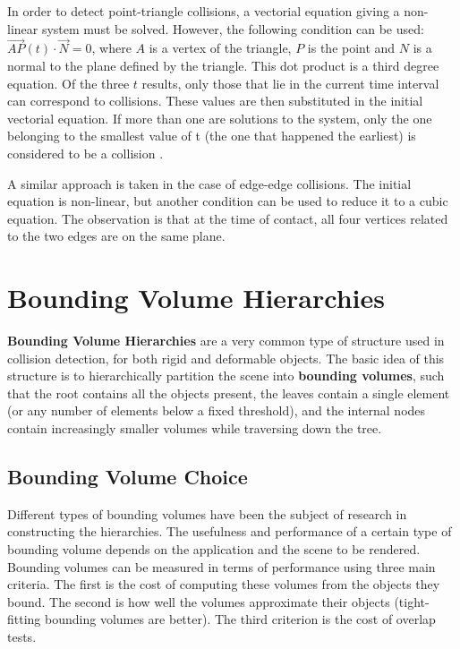 In order to detect point-triangle collisions, a vectorial equation giving a non-linear system must be solved. However, the following condition can be used: $\overrightarrow{AP}(t) \cdot \overrightarrow{N} = 0$, where $A$ is a vertex of the triangle, $P$ is the point and $N$ is a normal to the plane defined by the triangle. This dot product is a third degree equation. Of the three $t$ results, only those that lie in the current time interval can correspond to collisions. These values are then substituted in the initial vectorial equation. If more than one are solutions to the system, only the one belonging to the smallest value of t (the one that happened the earliest) is considered to be a collision \citep{provot97}.

A similar approach is taken in the case of edge-edge collisions. The initial equation is non-linear, but another condition can be used to reduce it to a cubic equation. The observation is that at the time of contact, all four vertices related to the two edges are on the same plane.


\section{Bounding Volume Hierarchies}
\label{sec:bvh}


\textbf{Bounding Volume Hierarchies} are a very common type of structure used in collision detection, for both rigid and deformable objects. The basic idea of this structure is to hierarchically partition the scene into \textbf{bounding volumes}, such that the root contains all the objects present, the leaves contain a single element (or any number of elements below a fixed threshold), and the internal nodes contain increasingly smaller volumes while traversing down the tree.

\subsection{Bounding Volume Choice}
\label{sub-sec:bvc}

Different types of bounding volumes have been the subject of research in constructing the hierarchies. The usefulness and performance of a certain type of bounding volume depends on the application and the scene to be rendered. Bounding volumes can be measured in terms of performance using three main criteria. The first is the cost of computing these volumes from the objects they bound. The second is how well the volumes approximate their objects (tight-fitting bounding volumes are better). The third criterion is the cost of overlap tests.

